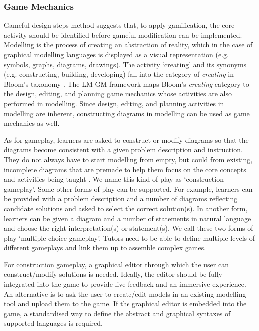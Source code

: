 \documentclass[conference]{IEEEtran}
\begin{document}
\subsubsection{Game Mechanics} 
\label{Game Mechanics} 
Gameful design steps method \cite{deterding2015lens} suggests that, to apply gamification, the core activity should be identified before gameful modification can be implemented. Modelling is the process of creating an abstraction of reality, which in the case of graphical modelling languages is displayed as a visual representation (e.g. symbols, graphs, diagrams, drawings). The activity `creating' and its synonyms (e.g. constructing, building, developing) fall into the category of \emph{creating} in Bloom's taxonomy \cite{krathwohl2002revision}. The LM-GM framework \cite{arnab2015mapping} maps Bloom's \emph{creating} category to the design, editing, and planning game mechanics whose activities are also performed in modelling. Since design, editing, and planning activities in modelling are inherent, constructing diagrams in modelling can be used as game mechanics as well. 

As for gameplay, learners are asked to construct or modify diagrams so that the diagrams become consistent with a given problem description and instruction. They do not always have to start modelling from empty, but could from existing, incomplete diagrams that are premade to help them focus on the core concepts and activities being taught \cite{deterding2015lens}. We name this kind of play as `construction gameplay'. Some other forms of play can be supported. For example, learners can be provided with a problem description and a number of diagrams reflecting candidate solutions and asked to select the correct solution(s). In another form, learners can be given a diagram and a number of statements in natural language and choose the right interpretation(s) or statement(s). We call these two forms of play `multiple-choice gameplay'. Tutors need to be able to define multiple levels of different gameplays and link them up to assemble complex games. 

For construction gameplay, a graphical editor through which the user can construct/modify solutions is needed. Ideally, the editor should be fully integrated into the game to provide live feedback and an immersive experience. An alternative is to ask the user to create/edit models in an existing modelling tool and upload them to the game. If the graphical editor is embedded into the game, a standardised way to define the abstract and graphical syntaxes of supported languages is required. 
\end{document}

